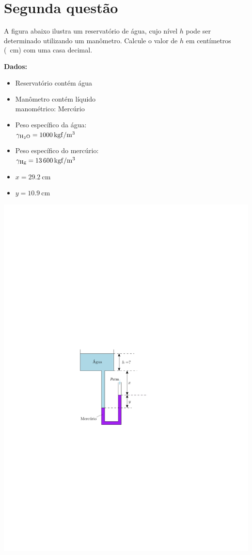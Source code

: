 \documentclass[
	a4paper,
	12pt,
	brazilian
]{article}
\begin{document}
	\section{Segunda questão}
	
	A figura abaixo ilustra um reservatório de água, cujo nível $h$ pode ser determinado utilizando um manômetro. Calcule o valor de $h$ em centímetros (\SI{}{\centi\meter}) com uma casa decimal.\\\vspace{.5cm}
	
	\textbf{Dados:}
	\begin{itemize}
		\item Reservatório contém água
		\item Manômetro contém líquido\\ manométrico: Mercúrio
		\item Peso específico da água:\\ $\gamma_{\ce{H2O}}=\SI{1000}{kgf/\meter^{3}}$
		\item Peso específico do mercúrio:\\ $\gamma_{\ce{Hg}}=\SI{13600}{kgf/\meter^{3}}$
		\item $x=\SI{29.2}{\centi\meter}$
		\item $y=\SI{10.9}{\centi\meter}$
	\end{itemize}
	\vspace{-7.5cm}
	\begin{flushright}
		\includegraphics[width=.45\linewidth]{assets/images/ex2}
	\end{flushright}
\end{document}
